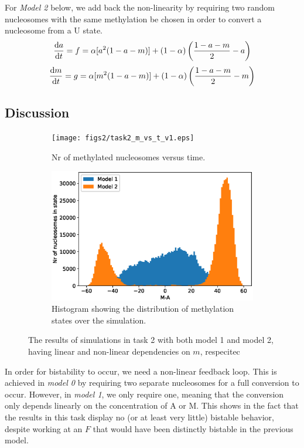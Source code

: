 \documentclass{article}
\begin{document}
For \textit{Model 2} below, we add back the non-linearity by requiring two random nucleosomes with the same methylation be chosen in order to convert a nucleosome from a U state.
\begin{equation}
	\dv {a}{t} = f = \alpha[a^2(1-a-m)] + (1-\alpha )\left(\frac{1-a-m}{2}  - a\right)
\end{equation}
\begin{equation}
	\dv {m}{t} = g = \alpha[m^2(1-a-m)] + (1-\alpha )\left(\frac{1-a-m}{2}  - m\right)
\end{equation}


\subsection{Discussion}
\begin{figure}[H]
	\centering
	\begin{subfigure}[b]{.49\textwidth}
		\centering
		\texttt{[image: figs2/task2\_m\_vs\_t\_v1.eps]}
		\caption{Nr of methylated nucleosomes versus time. }
		\label{fig:task2_m_vs_t}
	\end{subfigure}
	\begin{subfigure}[b]{.49\textwidth}
		\centering
		\includegraphics[width= \linewidth]{figs2/task2_hist_v1.eps}
		\caption{Histogram showing the distribution of methylation states over the simulation.}
		\label{fig:task2_hist}
	\end{subfigure}
		\caption{The results of simulations in task 2 with both model 1 and model 2, having linear and non-linear dependencies on $m$, respecitec}
		\label{fig:task2}
\end{figure}

In order for bistability to occur, we need a non-linear feedback loop. This is achieved in \textit{model 0} by requiring two separate nucleosomes for a full conversion to occur. However, in \textit{model 1}, we only require one, meaning that the conversion only depends linearly on the concentration of A or M. This shows in the fact that the results in this task display no (or at least very little) bistable behavior, despite working at an $F$ that would have been distinctly bistable in the previous model. 
\end{document}
